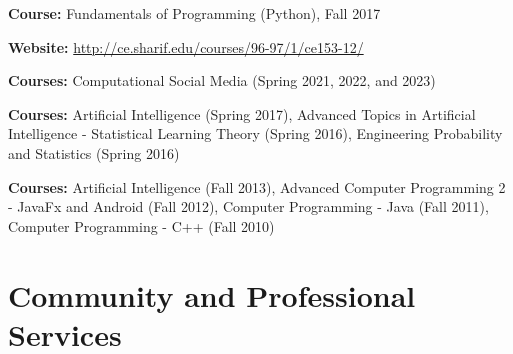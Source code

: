 \documentclass[11pt]{article}
\begin{document}
\begin{innerlist}
  \item[] \textbf{Course:} Fundamentals of Programming (Python), Fall 2017
  \item[] \textbf{Website:} \href{http://ce.sharif.edu/courses/96-97/1/ce153-12/}{http://ce.sharif.edu/courses/96-97/1/ce153-12/}
\end{innerlist}

\begin{innerlist}
  \item[] \textbf{Courses:} Computational Social Media (Spring 2021, 2022, and 2023)
\end{innerlist}

\begin{innerlist}
  \item[] \textbf{Courses:} Artificial Intelligence (Spring 2017),
  Advanced Topics in Artificial Intelligence - Statistical Learning Theory (Spring 2016),
  Engineering Probability and Statistics (Spring 2016)
\end{innerlist}

\begin{innerlist}
  \item[] \textbf{Courses:} Artificial Intelligence (Fall 2013),
  Advanced Computer Programming 2 - JavaFx and Android  (Fall 2012),
  Computer Programming - Java (Fall 2011),
  Computer Programming - C++ (Fall 2010)\\
\end{innerlist}


\section{Community and Professional Services}
\end{document}

